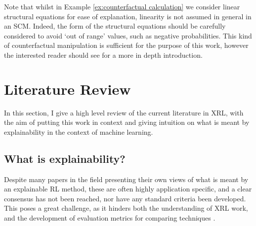 \documentclass{article}
\begin{document}
\noindent 
Note that whilst in Example \ref{ex:counterfactual calculation} we consider linear structural equations for ease of explanation, linearity is not assumed in general in an SCM. Indeed, the form of the structural equations should be carefully considered to avoid `out of range' values, such as negative probabilities. This kind of counterfactual manipulation is sufficient for the purpose of this work, however the interested reader should see \cite{pearl2009causality} for a more in depth introduction.

\pagebreak

\section{Literature Review}
In this section, I give a high level review of the current literature in XRL, with the aim of putting this work in context and giving intuition on what is meant by explainability in the context of machine learning.  

\subsection{What is explainability?}
\label{sec:explainability}

Despite many papers in the field presenting their own views of what is meant by an explainable RL method, these are often highly application specific, and a clear consensus has not been reached, nor have any standard criteria been developed. This poses a great challenge, as it hinders both the understanding of XRL work, and the development of evaluation metrics for comparing techniques \cite{qing2022survey}. 
\end{document}
